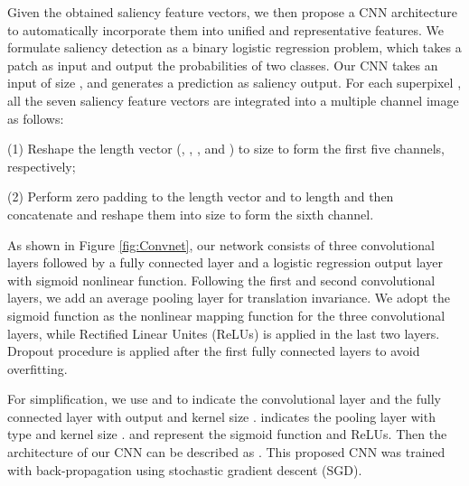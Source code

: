 \documentclass[journal]{IEEEtran}
\begin{document}
Given the obtained saliency feature vectors, we then propose a CNN architecture to automatically incorporate them into unified and representative features. We formulate saliency detection as a binary logistic regression problem, which takes a patch as input and output the probabilities of two classes. Our CNN takes an input of size , and generates a prediction as saliency output. For each superpixel , all the seven saliency feature vectors are integrated into a multiple channel image as follows:

(1) Reshape the  length vector (, , ,  and ) to size  to form the first five channels, respectively;

(2) Perform zero padding to the  length vector  and  to length  and then concatenate and reshape them into size  to form the sixth channel.

As shown in Figure \ref{fig:Convnet}, our network consists of three convolutional layers followed by a fully connected layer and a logistic regression output layer with sigmoid nonlinear function. Following the first and second convolutional layers, we add an average pooling layer for translation invariance. We adopt the sigmoid function as the nonlinear mapping function for the three convolutional layers, while Rectified Linear Unites (ReLUs) is applied in the last two layers. Dropout procedure is applied after the first fully connected layers to avoid overfitting.

For simplification, we use  and  to indicate the convolutional layer and the fully connected layer with  output and kernel size .  indicates the pooling layer with type  and kernel size .  and  represent the sigmoid function and ReLUs. Then the architecture of our CNN can be described as . This proposed CNN was trained with back-propagation using stochastic gradient descent (SGD).
\end{document}
